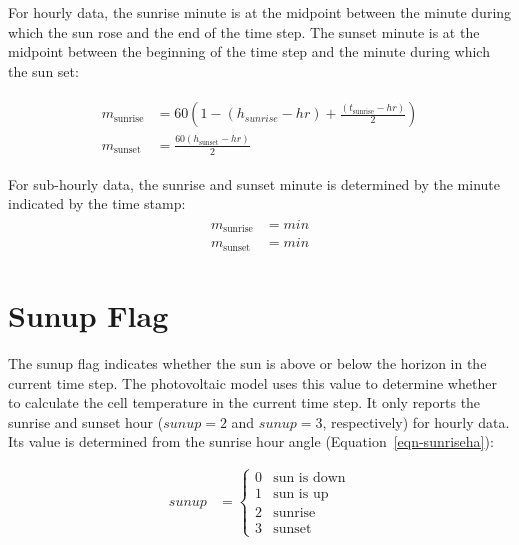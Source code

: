 \documentclass[12pt,letterpaper]{article}
\begin{document}
For hourly data, the sunrise minute is at the midpoint between the minute during which the sun rose and the end of the time step. The sunset minute is at the midpoint between the beginning of the time step and the minute during which the sun set: 

\begin{align}
\begin{array}{ll}
\mathit{m}_\mathrm{sunrise}&=60 \left(1 - (h_{sunrise} -\mathit{hr}) + \frac{(t_{\mathrm{sunrise}} - hr)}{2}\right)\\
\mathit{m}_{\mathrm{sunset}}&=\frac{60 (h_{\mathrm{sunset}} - \mathit{hr})}{2}
\end{array}
\end{align}

For sub-hourly data, the sunrise and sunset minute is determined by the minute indicated by the time stamp:
\begin{align}
\begin{array}{ll}
\mathit{m}_\mathrm{sunrise}&=\mathit{min}\\
\mathit{m}_\mathrm{sunset}&=\mathit{min}
\end{array}
\end{align}

\section{Sunup Flag}\label{sec-sunup}

The sunup flag indicates whether the sun is above or below the horizon in the current time step. The photovoltaic model uses this value to determine whether to calculate the cell temperature in the current time step. It only reports the sunrise and sunset hour ($\mathit{sunup}=2$ and $\mathit{sunup}=3$, respectively) for hourly data. Its value is determined from the sunrise hour angle (Equation~\ref{eqn-sunriseha}):

\begin{align}\label{eqn-sunrise}
sunup &= \left\{
\begin{array}{ll}
0 & \text{sun is down}\\
1 & \text{sun is up}\\
2 & \text{sunrise}\\
3 & \text{sunset}
\end{array}
\right.
\end{align}
\end{document}
